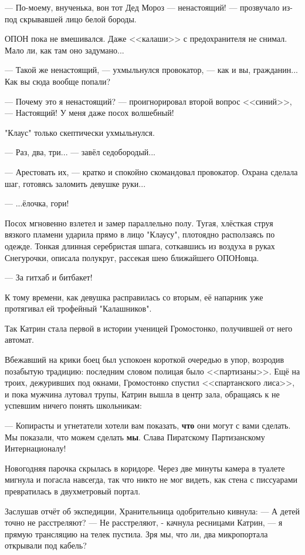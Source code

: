 --- По-моему, внученька, вон тот Дед Мороз --- ненастоящий! --- прозвучало из-под скрывавшей лицо белой бороды.

ОПОН пока не вмешивался. Даже <<калаши>> с предохранителя не снимал. Мало ли, как там оно задумано...

--- Такой же ненастоящий, --- ухмыльнулся провокатор, --- как и вы, гражданин... Как вы сюда вообще попали?

--- Почему это я ненастоящий? --- проигнорировал второй вопрос <<синий>>, --- Настоящий! У меня даже посох волшебный!

"Клаус" только скептически ухмыльнулся.

--- Раз, два, три... --- завёл седобородый...

--- Арестовать их, --- кратко и спокойно скомандовал провокатор. Охрана сделала шаг, готовясь заломить девушке руки...

--- ...ёлочка, гори!

\emptypar

Посох мгновенно взлетел и замер параллельно полу.
Тугая, хлёсткая струя вязкого пламени ударила прямо в лицо "Клаусу", плотоядно расползаясь по одежде.
Тонкая длинная серебристая шпага, соткавшись из воздуха в руках Снегурочки, описала полукруг, рассекая шею ближайшего ОПОНовца.

--- За гитхаб и битбакет! 

К тому времени, как девушка расправилась со вторым, её напарник уже протягивал ей трофейный "Калашников".

Так Катрин стала первой в истории ученицей Громостонко, получившей от него автомат.

Вбежавший на крики боец был успокоен короткой очередью в упор, возродив позабытую традицию:
последним словом полицая было <<партизаны>>.
Ещё на троих, дежуривших под окнами, Громостонко спустил <<спартанского лиса>>, и пока мужчина лутовал трупы,
Катрин вышла в центр зала, обращаясь к не успевшим ничего понять школьникам:

--- Копирасты и угнетатели хотели вам показать, \textbf{что} они могут с вами сделать.
Мы показали, что можем сделать \textbf{мы}. Слава Пиратскому Партизанскому Интернационалу!

Новогодняя парочка скрылась в коридоре.
Через две минуты камера в туалете мигнула и погасла навсегда, так что никто не мог видеть,
как стена с писсуарами превратилась в двухметровый портал.


Заслушав отчёт об экспедиции, Хранительница одобрительно кивнула:
--- А детей точно не расстреляют?
--- Не расстреляют, - качнула ресницами Катрин, --- я прямую трансляцию на телек пустила.
Зря мы, что ли, два микропортала открывали под кабель?

